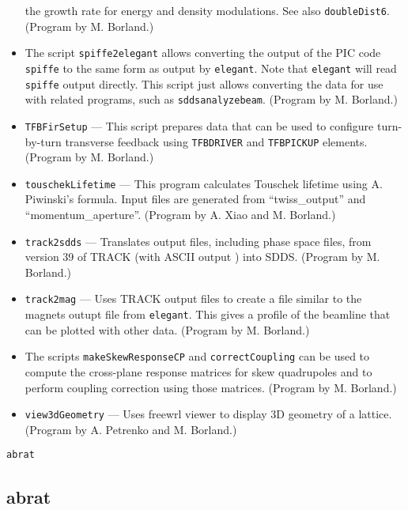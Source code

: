 \documentclass[11pt]{article}
\begin{document}
\begin{itemize}
 the growth rate for energy and density modulations.  See also {\tt doubleDist6}.
  (Program by M. Borland.)
\item The script \verb|spiffe2elegant| allows converting the output of the PIC code \verb|spiffe| to the same form
  as output by \verb|elegant|.  Note that \verb|elegant| will read \verb|spiffe| output directly. This script just allows converting the
  data for use with related programs, such as \verb|sddsanalyzebeam|.
  (Program by M. Borland.)
\item {\tt TFBFirSetup} --- This script prepares data that can be used to configure turn-by-turn transverse feedback using
  \verb|TFBDRIVER| and \verb|TFBPICKUP| elements.
  (Program by M. Borland.)
\item {\tt touschekLifetime} --- This program calculates Touschek lifetime using A. Piwinski's formula.
        Input files are generated from ``twiss\_output'' and ``momentum\_aperture''.  (Program by A. Xiao and M. Borland.)
\item {\tt track2sdds} --- Translates output files, including phase space files, from version 39 of TRACK (with ASCII output \cite{TRACK})
  into SDDS. 
  (Program by M. Borland.)
\item {\tt track2mag} --- Uses TRACK output files to create a file similar to the magnets outupt file from {\tt elegant}.
  This gives a profile of the beamline that can be plotted with other data.
  (Program by M. Borland.)
\item The scripts \verb|makeSkewResponseCP| and \verb|correctCoupling| can be used to compute the cross-plane response
  matrices for skew quadrupoles and to perform coupling correction using those matrices.
  (Program by M. Borland.)
\item {\tt view3dGeometry} --- Uses freewrl viewer to display 3D geometry of a lattice. 
  (Program by A. Petrenko and M. Borland.)
\end{itemize}

\newpage
\begin{center}{\Large\verb|abrat|}\end{center}
\subsection{abrat}
\end{document}
